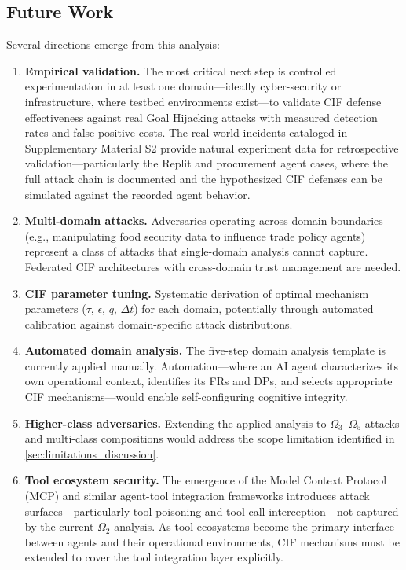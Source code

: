 \documentclass[
]{article}
\begin{document}
\subsection{Future Work}\label{future-work}

Several directions emerge from this analysis:

\begin{enumerate}
\def\labelenumi{\arabic{enumi}.}
\item
  \textbf{Empirical validation.} The most critical next step is
  controlled experimentation in at least one domain---ideally
  cyber-security or infrastructure, where testbed environments
  exist---to validate CIF defense effectiveness against real Goal
  Hijacking attacks with measured detection rates and false positive
  costs. The real-world incidents cataloged in Supplementary Material S2
  provide natural experiment data for retrospective
  validation---particularly the Replit and procurement agent cases,
  where the full attack chain is documented and the hypothesized CIF
  defenses can be simulated against the recorded agent behavior.
\item
  \textbf{Multi-domain attacks.} Adversaries operating across domain
  boundaries (e.g., manipulating food security data to influence trade
  policy agents) represent a class of attacks that single-domain
  analysis cannot capture. Federated CIF architectures with cross-domain
  trust management are needed.
\item
  \textbf{CIF parameter tuning.} Systematic derivation of optimal
  mechanism parameters (\(\tau\), \(\epsilon\), \(q\), \(\Delta t\)) for
  each domain, potentially through automated calibration against
  domain-specific attack distributions.
\item
  \textbf{Automated domain analysis.} The five-step domain analysis
  template is currently applied manually. Automation---where an AI agent
  characterizes its own operational context, identifies its FRs and DPs,
  and selects appropriate CIF mechanisms---would enable self-configuring
  cognitive integrity.
\item
  \textbf{Higher-class adversaries.} Extending the applied analysis to
  \(\Omega_3\)--\(\Omega_5\) attacks and multi-class compositions would
  address the scope limitation identified in
  \cref{sec:limitations_discussion}.
\item
  \textbf{Tool ecosystem security.} The emergence of the Model Context
  Protocol (MCP) and similar agent-tool integration frameworks
  introduces attack surfaces---particularly tool poisoning and tool-call
  interception---not captured by the current \(\Omega_2\) analysis. As
  tool ecosystems become the primary interface between agents and their
  operational environments, CIF mechanisms must be extended to cover the
  tool integration layer explicitly.
\end{enumerate}
\end{document}
